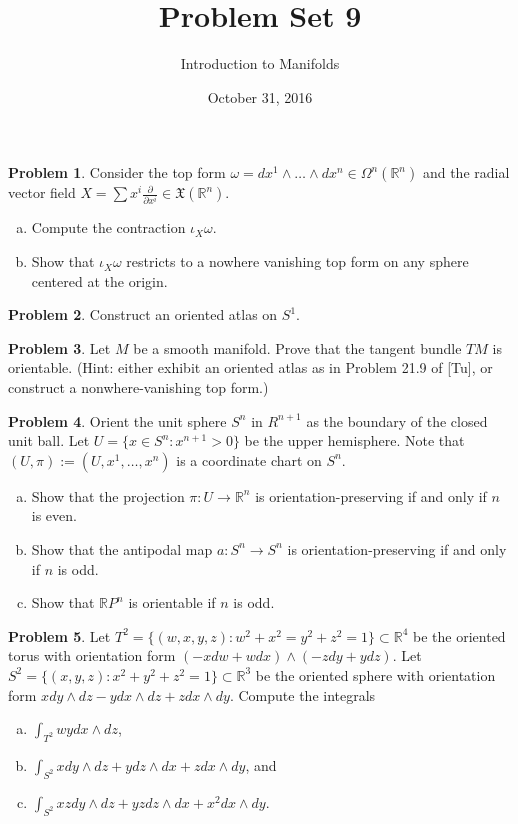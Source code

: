 \documentclass{amsart}
\newcommand{\+}[1]{\ensuremath{\mathbf{#1}}}
\newcommand{\R}{{\mathbb R}}
\theoremstyle{definition}
\newtheorem{prob}{Problem}
\begin{document}
\title{Problem Set 9}
\date{October 31, 2016}
\author{Introduction to Manifolds}

\maketitle

\begin{prob}
Consider the top form $\omega = dx^1 \wedge \ldots \wedge dx^n \in \Omega^n(\R^n)$
and the radial vector field
$X = \sum x^i \frac{\partial}{\partial x^i} \in \mathfrak{X}(\R^n)$.
\begin{enumerate}[(a)]
 \item Compute the contraction $\iota_X\omega$.
 \item Show that $\iota_X\omega$ restricts to a nowhere vanishing top form
 on any sphere centered at the origin.
\end{enumerate}
\end{prob}


\begin{prob}
Construct an oriented atlas on $S^1$.
\end{prob}

\begin{prob}
Let $M$ be a smooth manifold.  Prove that the tangent bundle
$TM$ is orientable.  (Hint: either exhibit an oriented atlas
as in Problem 21.9 of [Tu], or construct a nonwhere-vanishing
top form.)
\end{prob}

\begin{prob}
Orient the unit sphere $S^n$ in $R^{n+1}$ as the boundary
of the closed unit ball.  Let $U = \{x \in S^n: x^{n+1}>0\}$ 
be the upper hemisphere.  Note that $(U,\pi) := (U,x^1,\ldots,x^n)$
is a coordinate chart on $S^n$.
\begin{enumerate}[(a)]
 \item Show that the projection $\pi: U \to \R^n$ is
 orientation-preserving if and only if $n$ is even.
 \item Show that the antipodal map $a: S^n \to S^n$
 is orientation-preserving if and only if $n$ is odd.
 \item Show that $\R P^n$ is orientable if $n$ is odd.
\end{enumerate}
\end{prob}



\begin{prob}
Let $T^2 = \{(w,x,y,z): w^2 + x^2 = y^2 + z^2 =1\} \subset \R^4$ be the oriented torus with
orientation form $(-x dw + w dx) \wedge (-z dy + y dz)$.
Let $S^2 = \{(x,y,z): x^2 + y^2 + z^2 = 1\} \subset \R^3$
be the oriented sphere with orientation form
$x dy \wedge dz - y dx \wedge dz + z dx \wedge dy$.
Compute the integrals
\begin{enumerate}[(a)]
 \item  $\int_{T^2} wy dx \wedge dz$,
 \item  $\int_{S^2} x dy \wedge dz + y dz \wedge dx + z dx \wedge dy$, and 
 \item  $\int_{S^2} xz dy \wedge dz + yz dz \wedge dx + x^2 dx \wedge dy$.
\end{enumerate}
\end{prob}
\end{document}
